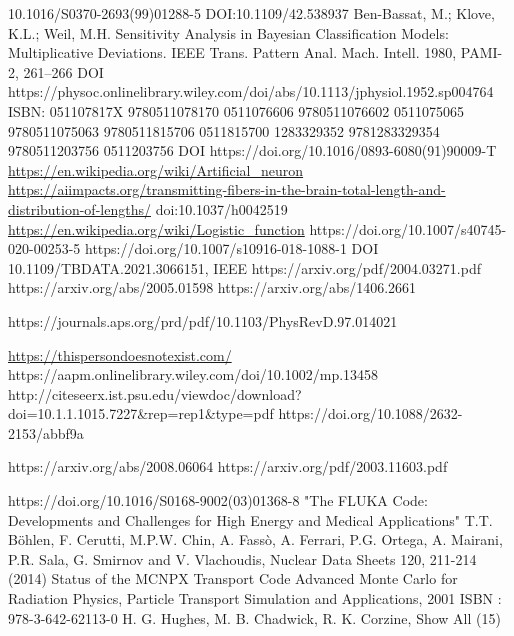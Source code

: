 \begin{thebibliography}{99}

 10.1016/S0370-2693(99)01288-5
 DOI:10.1109/42.538937
 Ben-Bassat, M.; Klove, K.L.; Weil, M.H. Sensitivity Analysis in Bayesian Classification Models: Multiplicative Deviations. IEEE Trans. Pattern Anal. Mach. Intell. 1980, PAMI-2, 261–266
  DOI https://physoc.onlinelibrary.wiley.com/doi/abs/10.1113/jphysiol.1952.sp004764
  ISBN:	051107817X 9780511078170 0511076606 9780511076602 0511075065 9780511075063 9780511815706 0511815700 1283329352 9781283329354 9780511203756 0511203756
 DOI https://doi.org/10.1016/0893-6080(91)90009-T
 \url{https://en.wikipedia.org/wiki/Artificial_neuron}
 \url{https://aiimpacts.org/transmitting-fibers-in-the-brain-total-length-and-distribution-of-lengths/}
 doi:10.1037/h0042519
 \url{https://en.wikipedia.org/wiki/Logistic_function}
 https://doi.org/10.1007/s40745-020-00253-5
https://doi.org/10.1007/s10916-018-1088-1
  DOI 10.1109/TBDATA.2021.3066151, IEEE
 https://arxiv.org/pdf/2004.03271.pdf
 https://arxiv.org/abs/2005.01598
 https://arxiv.org/abs/1406.2661

 https://journals.aps.org/prd/pdf/10.1103/PhysRevD.97.014021

 \url{https://thispersondoesnotexist.com/}
 https://aapm.onlinelibrary.wiley.com/doi/10.1002/mp.13458
 http://citeseerx.ist.psu.edu/viewdoc/download?doi=10.1.1.1015.7227&rep=rep1&type=pdf
 https://doi.org/10.1088/2632-2153/abbf9a


 https://arxiv.org/abs/2008.06064
 https://arxiv.org/pdf/2003.11603.pdf


 https://doi.org/10.1016/S0168-9002(03)01368-8
 "The FLUKA Code: Developments and Challenges for High Energy and Medical Applications" T.T. Böhlen, F. Cerutti, M.P.W. Chin, A. Fassò, A. Ferrari, P.G. Ortega, A. Mairani, P.R. Sala, G. Smirnov and V. Vlachoudis, Nuclear Data Sheets 120, 211-214 (2014)
 Status of the MCNPX Transport Code Advanced Monte Carlo for Radiation Physics, Particle Transport Simulation and Applications, 2001 ISBN : 978-3-642-62113-0 H. G. Hughes, M. B. Chadwick, R. K. Corzine, Show All (15)


\end{thebibliography}

